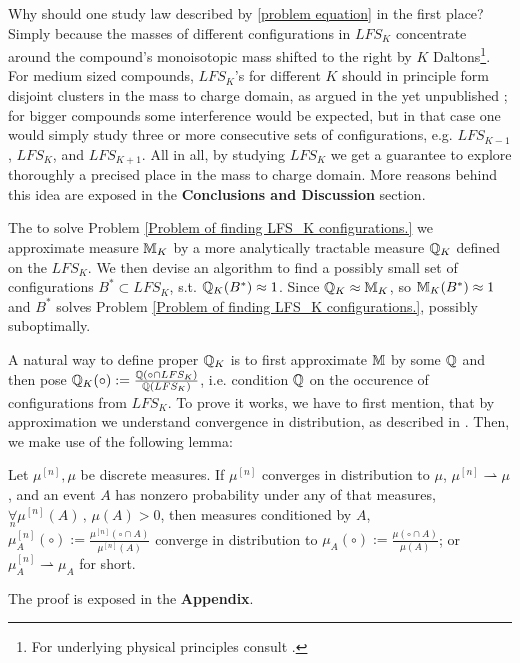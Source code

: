 Why should one study law described by \eqref{problem equation} in the first place? Simply because the masses of different configurations in $LFS_K$ concentrate around the compound's monoisotopic mass shifted to the right by $K$ Daltons\footnote{For underlying physical principles consult \cite{Hughey2001KendrickMassDefect}.}. For medium sized compounds, $LFS_K$'s for different $K$ should in principle form disjoint clusters in the mass to charge domain, as argued in the yet unpublished \cite{Dittwald2014}; for bigger compounds some interference would be expected, but in that case one would simply study three or more consecutive sets of configurations, e.g. $LFS_{K-1}$, $LFS_K$, and $LFS_{K+1}$. All in all, by studying $LFS_K$ we get a guarantee to explore thoroughly a precised place in the mass to charge domain. More reasons behind this idea are exposed in the \textbf{Conclusions and Discussion} section. 


The to solve Problem \ref{Problem of finding LFS_K configurations.} we approximate measure $\mathbb{M}_K$ by a more analytically tractable measure $\mathbb{Q}_K$ defined on the $LFS_K$. We then devise an algorithm to find a possibly small set of configurations $B^* \subset LFS_K$, s.t. $\mathbb{Q}_K (B^*) \approx 1$. Since $\mathbb{Q}_K \approx \mathbb{M}_K$, so $\mathbb{M}_K (B^*) \approx 1$ and $B^*$ solves Problem \ref{Problem of finding LFS_K configurations.}, possibly suboptimally.


A natural way to define proper $\mathbb{Q}_K$ is to first approximate $\mathbb{M}$ by some $\mathbb{Q}$ and then pose $\mathbb{Q}_K (\circ) := \frac{\mathbb{Q} (\circ \cap LFS_K) }{\mathbb{Q}(LFS_K)}$, i.e. condition $\mathbb{Q}$ on the occurence of configurations from $LFS_K$. To prove it works, we have to first mention, that by approximation we understand convergence in distribution, as described in \cite{Kallenberg2002FoundationsOfModernProbability}. Then, we make use of the following lemma: 

\begin{lemma}\label{conditional convergence lemma}
	Let $\mu^{[n]}, \mu$ be discrete measures. If $\mu^{[n]}$ converges in distribution to $\mu$, $\mu^{[n]} \rightharpoonup  \mu$, and an event $A$ has nonzero probability under any of that measures, $\underset{n}{\forall} \mu^{[n]}(A)\,,\, \mu(A) > 0$, then measures conditioned by $A$, $\mu^{[n]}_A (\circ) := \frac{\mu^{[n]} ( \circ \cap A)}{\mu^{[n]}(A)}$ converge in distribution to $\mu_A (\circ) := \frac{ \mu( \circ \cap A) }{ \mu(A) }$; or $\mu^{[n]}_A \rightharpoonup \mu_A$ for short.
\end{lemma}  
The proof is exposed in the \textbf{Appendix}.  


